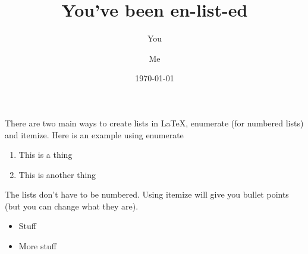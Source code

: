 \documentclass[a4paper]{article}
\begin{document}
\title{You've been en-list-ed}
\author{You \and Me}
\date{\today}
\maketitle

There are two main ways to create lists in LaTeX, enumerate (for numbered lists) and itemize. Here is an example using enumerate 

\begin{enumerate}
\item This is a thing
\item This is another thing 
\end{enumerate}

The lists don't have to be numbered. Using itemize will give you bullet points (but you can change what they are). 
\begin{itemize}
\item Stuff
\item More stuff 
\end{itemize}
\end{document}
